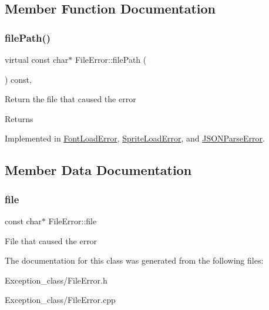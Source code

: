 \subsection{Member Function Documentation}
\mbox{\label{classFileError_a40918f5dda2ee7063bba81d286392cdd}} 
\subsubsection{\texorpdfstring{file\+Path()}{filePath()}}
{\footnotesize\ttfamily virtual const char$\ast$ File\+Error\+::file\+Path (\begin{DoxyParamCaption}{ }\end{DoxyParamCaption}) const\hspace{0.3cm}{\ttfamily [pure virtual]}, {\ttfamily [noexcept]}}

Return the file that caused the error \begin{DoxyReturn}{Returns}

\end{DoxyReturn}


Implemented in \hyperlink{classFontLoadError_aa1b4295ca60b389717e40fcbf723fb83}{Font\+Load\+Error}, \hyperlink{classSpriteLoadError_aa6c6ca97b781b8045eb4271aad6aa6d1}{Sprite\+Load\+Error}, and \hyperlink{classJSONParseError_a24c5c1358b6ae6c96b30ebaa96e0a30b}{J\+S\+O\+N\+Parse\+Error}.



\subsection{Member Data Documentation}
\mbox{\label{classFileError_a0ea1cc225bf7f8fa47aa0cfa0c2ba685}} 
\subsubsection{\texorpdfstring{file}{file}}
{\footnotesize\ttfamily const char$\ast$ File\+Error\+::file\hspace{0.3cm}{\ttfamily [protected]}}

File that caused the error 

The documentation for this class was generated from the following files\+:\begin{DoxyCompactItemize}
\item 
Exception\+\_\+class/File\+Error.\+h\item 
Exception\+\_\+class/File\+Error.\+cpp\end{DoxyCompactItemize}
